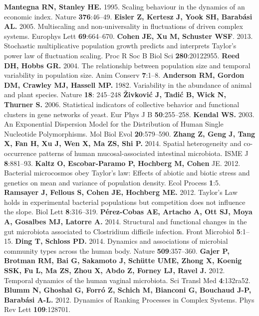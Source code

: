 \documentclass[12pt,oneside,letterpaper]{article}
\begin{document}
\begin{thebibliography}{99}
 {\bf Mantegna RN, Stanley HE.} 1995. Scaling behaviour in the dynamics of an economic index. Nature {\bf 376}:46–49.
 {\bf Eisler Z, Kertesz J, Yook SH, Barabási AL.} 2005. Multiscaling and non-universality in fluctuations of driven complex systems. Europhys Lett {\bf 69}:664–670.
 {\bf Cohen JE, Xu M, Schuster WSF}. 2013. Stochastic multiplicative population growth predicts and interprets Taylor’s power law of fluctuation scaling. Proc R Soc B Biol Sci {\bf 280}:20122955.
 {\bf Reed DH, Hobbs GR.} 2004. The relationship between population size and temporal variability in population size. Anim Conserv {\bf 7}:1–8.
 {\bf Anderson RM, Gordon DM, Crawley MJ, Hassell MP.} 1982. Variability in the abundance of animal and plant species. Nature {\bf 18}: 245–248
 {\bf Živković J, Tadić B, Wick N, Thurner S.} 2006. Statistical indicators of collective behavior and functional clusters in gene networks of yeast. Eur Phys J B {\bf 50}:255–258.
 {\bf Kendal WS.} 2003. An Exponential Dispersion Model for the Distribution of Human Single Nucleotide Polymorphisms. Mol Biol Evol {\bf 20}:579–590.
 {\bf Zhang Z, Geng J, Tang X, Fan H, Xu J, Wen X, Ma ZS, Shi P.} 2014. Spatial heterogeneity and co-occurrence patterns of human mucosal-associated intestinal microbiota. ISME J {\bf 8}:881–93.
 {\bf Kaltz O, Escobar-Paramo P, Hochberg M, Cohen} JE. 2012. Bacterial microcosmos obey Taylor’s law: Effects of abiotic and biotic stress and genetics on mean and variance of population density. Ecol Process {\bf 1}:5.
 {\bf Ramsayer J, Fellous S, Cohen JE, Hochberg ME.} 2012. Taylor’s Law holds in experimental bacterial populations but competition does not influence the slope. Biol Lett {\bf 8}:316–319.
 {\bf Pérez-Cobas AE, Artacho A, Ott SJ, Moya A, Gosalbes MJ, Latorre A.} 2014. Structural and functional changes in the gut microbiota associated to Clostridium difficile infection. Front Microbiol {\bf 5}:1–15.
 {\bf Ding T, Schloss PD.} 2014. Dynamics and associations of microbial community types across the human body. Nature {\bf 509}:357–360.
 {\bf Gajer P, Brotman RM, Bai G, Sakamoto J, Schütte UME, Zhong X, Koenig SSK, Fu L, Ma ZS, Zhou X, Abdo Z, Forney LJ, Ravel J.} 2012. Temporal dynamics of the human vaginal microbiota. Sci Transl Med {\bf 4}:132ra52.
 {\bf Blumm N, Ghoshal G, Forró Z, Schich M, Bianconi G, Bouchaud J-P, Barabási A-L.} 2012. Dynamics of Ranking Processes in Complex Systems. Phys Rev Lett {\bf 109}:128701.


\end{thebibliography}
\end{document}
